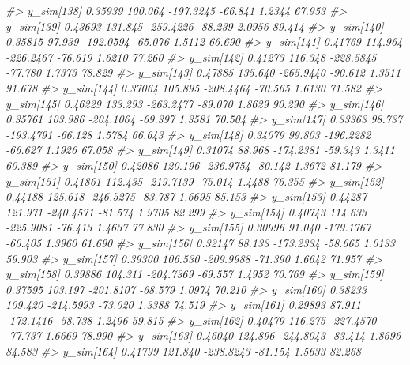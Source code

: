 \documentclass[
  10pt,
  italian,
  a4paper,
  extrafontsizes,onecolumn,openright
  ]{memoir}
\newenvironment{Shaded}{\begin{snugshade}}{\end{snugshade}}
\newcommand{\CommentTok}[1]{\textcolor[rgb]{0.56,0.35,0.01}{\textit{#1}}}
\begin{document}
\begin{Shaded}
\begin{Highlighting}[]
\CommentTok{\#\textgreater{}   y\_sim[138]  0.35939 100.064 {-}197.3245 {-}66.841  1.2344 67.953}
\CommentTok{\#\textgreater{}   y\_sim[139]  0.43693 131.845 {-}259.4226 {-}88.239  2.0956 89.414}
\CommentTok{\#\textgreater{}   y\_sim[140]  0.35815  97.939 {-}192.0594 {-}65.076  1.5112 66.690}
\CommentTok{\#\textgreater{}   y\_sim[141]  0.41769 114.964 {-}226.2467 {-}76.619  1.6210 77.260}
\CommentTok{\#\textgreater{}   y\_sim[142]  0.41273 116.348 {-}228.5845 {-}77.780  1.7373 78.829}
\CommentTok{\#\textgreater{}   y\_sim[143]  0.47885 135.640 {-}265.9440 {-}90.612  1.3511 91.678}
\CommentTok{\#\textgreater{}   y\_sim[144]  0.37064 105.895 {-}208.4464 {-}70.565  1.6130 71.582}
\CommentTok{\#\textgreater{}   y\_sim[145]  0.46229 133.293 {-}263.2477 {-}89.070  1.8629 90.290}
\CommentTok{\#\textgreater{}   y\_sim[146]  0.35761 103.986 {-}204.1064 {-}69.397  1.3581 70.504}
\CommentTok{\#\textgreater{}   y\_sim[147]  0.33363  98.737 {-}193.4791 {-}66.128  1.5784 66.643}
\CommentTok{\#\textgreater{}   y\_sim[148]  0.34079  99.803 {-}196.2282 {-}66.627  1.1926 67.058}
\CommentTok{\#\textgreater{}   y\_sim[149]  0.31074  88.968 {-}174.2381 {-}59.343  1.3411 60.389}
\CommentTok{\#\textgreater{}   y\_sim[150]  0.42086 120.196 {-}236.9754 {-}80.142  1.3672 81.179}
\CommentTok{\#\textgreater{}   y\_sim[151]  0.41861 112.435 {-}219.7139 {-}75.014  1.4488 76.355}
\CommentTok{\#\textgreater{}   y\_sim[152]  0.44188 125.618 {-}246.5275 {-}83.787  1.6695 85.153}
\CommentTok{\#\textgreater{}   y\_sim[153]  0.44287 121.971 {-}240.4571 {-}81.574  1.9705 82.299}
\CommentTok{\#\textgreater{}   y\_sim[154]  0.40743 114.633 {-}225.9081 {-}76.413  1.4637 77.830}
\CommentTok{\#\textgreater{}   y\_sim[155]  0.30996  91.040 {-}179.1767 {-}60.405  1.3960 61.690}
\CommentTok{\#\textgreater{}   y\_sim[156]  0.32147  88.133 {-}173.2334 {-}58.665  1.0133 59.903}
\CommentTok{\#\textgreater{}   y\_sim[157]  0.39300 106.530 {-}209.9988 {-}71.390  1.6642 71.957}
\CommentTok{\#\textgreater{}   y\_sim[158]  0.39886 104.311 {-}204.7369 {-}69.557  1.4952 70.769}
\CommentTok{\#\textgreater{}   y\_sim[159]  0.37595 103.197 {-}201.8107 {-}68.579  1.0974 70.210}
\CommentTok{\#\textgreater{}   y\_sim[160]  0.38233 109.420 {-}214.5993 {-}73.020  1.3388 74.519}
\CommentTok{\#\textgreater{}   y\_sim[161]  0.29893  87.911 {-}172.1416 {-}58.738  1.2496 59.815}
\CommentTok{\#\textgreater{}   y\_sim[162]  0.40479 116.275 {-}227.4570 {-}77.737  1.6669 78.990}
\CommentTok{\#\textgreater{}   y\_sim[163]  0.46040 124.896 {-}244.8043 {-}83.414  1.8696 84.583}
\CommentTok{\#\textgreater{}   y\_sim[164]  0.41799 121.840 {-}238.8243 {-}81.154  1.5633 82.268}

\end{Highlighting}
\end{Shaded}
\end{document}
